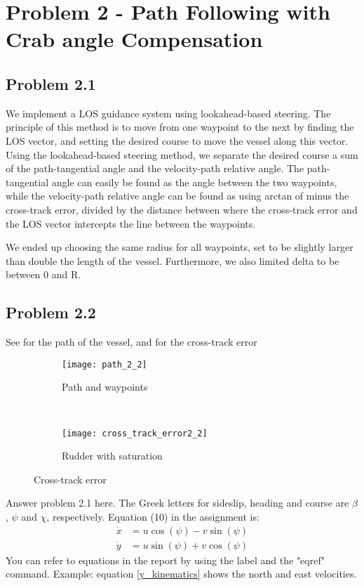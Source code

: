 \section*{Problem 2 - Path Following with Crab angle Compensation}
\subsection*{Problem 2.1}
We implement a LOS guidance system using lookahead-based steering. The principle of this method is to move from one waypoint to the next by finding the LOS vector, and setting the desired course to move the vessel along this vector. Using the lookahead-based steering method, we separate the desired course a sum of the path-tangential angle and the velocity-path relative angle. The path-tangential angle can easily be found as the angle between the two waypoints, while the velocity-path relative angle can be found as using arctan of minus the cross-track error, divided by the distance between where the cross-track error and the LOS vector intercepts the line between the waypoints. 

We ended up choosing the same radius for all waypoints, set to be slightly larger than double the length of the vessel. Furthermore, we also limited delta to be between 0 and R. 

\subsection{Problem 2.2}
See  for the path of the vessel, and  for the cross-track error 

\begin{figure}[ht]
	\begin{subfigure}[b]{0.3\textwidth}
		\texttt{[image: path\_2\_2]}
		\caption{Path and waypoints}
		\label{fig:path_2_2}
	\end{subfigure}%
        ~
	\begin{subfigure}[b]{0.3\textwidth}
		\texttt{[image: cross\_track\_error2\_2]}
		\caption{Rudder with saturation}
		\label{fig:cross_track_error2_2}
	\end{subfigure}
	\caption{Cross-track error}
	\label{fig:task2_2}
\end{figure}


Answer problem 2.1 here. The Greek letters for sideslip, heading and course are $\beta$, $\psi$ and $\chi$, respectively. Equation (10) in the assignment is:
\begin{equation}
\label{y_kinematics}
	\begin{aligned}
		\dot{x} &= u \cos (\psi) -v \sin (\psi) \\
		\dot{y} &= u \sin (\psi) + v \cos (\psi)
	\end{aligned}
\end{equation} 
You can refer to equations in the report by using the label and the "eqref" command. Example: equation \eqref{y_kinematics} shows the north and east velocities. 

